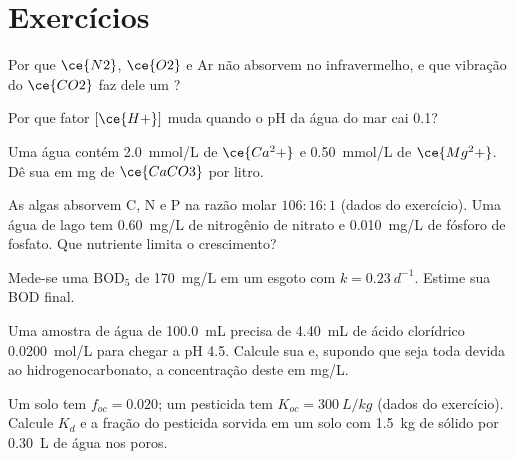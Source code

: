 \section{Exercícios}

\begin{exercise}[$\star$]\label{exo:b3:environmental-toxicology:1}
Por que $\ce{N2}$, $\ce{O2}$ e Ar não absorvem no infravermelho, e que vibração do $\ce{CO2}$ faz dele um
?
\end{exercise}

\begin{exercise}[$\star$]\label{exo:b3:environmental-toxicology:2}
Por que fator $[\ce{H+}]$ muda quando o pH da água do mar cai 0.1?
\end{exercise}

\begin{exercise}[$\star$]\label{exo:b3:environmental-toxicology:3}
Uma água contém \qty{2.0}{mmol/L} de $\ce{Ca^2+}$ e \qty{0.50}{mmol/L} de $\ce{Mg^2+}$. Dê sua  em mg de $\ce{CaCO3}$ por litro.
\end{exercise}

\begin{exercise}[$\star$]\label{exo:b3:environmental-toxicology:4}
As algas absorvem C, N e P na razão molar $106 : 16 : 1$ (dados do exercício). Uma água de lago
tem \qty{0.60}{mg/L} de nitrogênio de nitrato e \qty{0.010}{mg/L} de fósforo de fosfato. Que nutriente limita
o crescimento?
\end{exercise}

\begin{exercise}[$\star\star$]\label{exo:b3:environmental-toxicology:5}
Mede-se uma $\mathrm{BOD_5}$ de \qty{170}{mg/L} em um esgoto com $k = \qty{0.23}{d^{-1}}$. Estime sua BOD final.
\end{exercise}

\begin{exercise}[$\star\star$]\label{exo:b3:environmental-toxicology:6}
Uma amostra de água de \qty{100.0}{mL} precisa de \qty{4.40}{mL} de ácido clorídrico \qty{0.0200}{mol/L} para chegar a pH 4.5. Calcule sua
 e, supondo que seja toda devida ao hidrogenocarbonato, a concentração deste em mg/L.
\end{exercise}

\begin{exercise}[$\star\star$]\label{exo:b3:environmental-toxicology:7}
Um solo tem $f_{oc} = 0.020$; um pesticida tem $K_{oc} = \qty{300}{L/kg}$ (dados do exercício). Calcule $K_d$ e a
fração do pesticida sorvida em um solo com \qty{1.5}{kg} de sólido por \qty{0.30}{L} de água nos poros.
\end{exercise}

